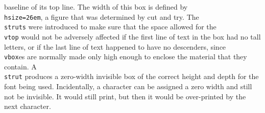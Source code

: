 baseline of its top line.
The width of this box is defined by {\tt \\hsize=26em}, a figure that was
determined by cut and try.
The {\tt \\struts} were introduced to make sure that
the space allowed for the {\tt \\vtop} would not be adversely affected if
the first line of text in the box had no tall letters, or if
the last line of text happened to have no descenders,
since {\tt \\vbox}es are normally made only high enough to enclose the material
that they contain.  A {\tt \\strut} produces a zero-width invisible box of
the correct height and depth for the font being used. Incidentally, a
character can be assigned a zero width and still not be invisible. It
would still print, but then it would be over-printed by the next character.

